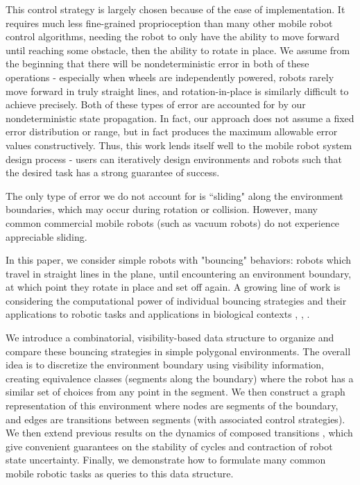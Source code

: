 \documentclass[]{styles/svproc}  %
\begin{document}
This control strategy is largely chosen because of the ease of implementation.
It requires much less fine-grained proprioception than many other mobile robot
control algorithms, needing the robot to only have the ability to move forward
until reaching some obstacle, then the ability to rotate in place. We assume
from the beginning that there will be nondeterministic error in both of these
operations - especially when wheels are independently powered, robots rarely
move forward in truly straight lines, and rotation-in-place is similarly
difficult to achieve precisely. Both of these types of error are accounted for
by our nondeterministic state propagation. In fact, our approach does not assume
a fixed error distribution or range, but in fact produces the maximum allowable
error values constructively. Thus, this work lends itself well to the mobile
robot system design process - users can iteratively design environments and
robots such that the desired task has a strong guarantee of success.

The only type of error we do not
account for is ``sliding" along the environment boundaries, which may occur
during rotation or collision. However, many common commercial mobile robots
(such as vacuum robots) do not experience appreciable sliding.

In this paper, we consider simple robots with "bouncing" behaviors: robots which
travel in straight lines in the plane, until encountering an environment
boundary, at which point they rotate in place and set off again. A growing line
of work is considering the computational power of individual bouncing strategies
and their applications to robotic tasks and applications in biological contexts
\cite{ErLav13}, \cite{microorganism2017}, \cite{alam2017minimalist}.

We introduce a combinatorial, visibility-based data structure to organize and
compare these bouncing strategies in simple polygonal environments. The overall
idea is to discretize the environment boundary using visibility information,
creating equivalence classes (segments along the boundary) where the robot has a
similar set of choices from any point in the segment. We then construct a graph
representation of this environment where nodes are segments of the boundary, and
edges are transitions between segments (with associated control strategies). We
then extend previous results on the dynamics of composed transitions
\cite{NilBecLav17}, which give convenient guarantees on the stability of cycles
and contraction of robot state uncertainty. Finally, we demonstrate how to
formulate many common mobile robotic tasks as queries to this data structure.
\end{document}
